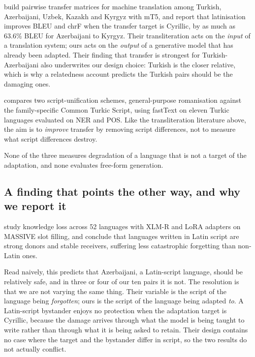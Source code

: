 \documentclass[final]{clv2025}
\begin{document}
 build pairwise transfer matrices for machine
translation among Turkish, Azerbaijani, Uzbek, Kazakh and Kyrgyz with mT5, and
report that latinisation improves BLEU and chrF when the transfer target is
Cyrillic, by as much as 63.6\% BLEU for Azerbaijani to Kyrgyz. Their
transliteration acts on the \emph{input} of a translation system; ours acts on
the \emph{output} of a generative model that has already been adapted. Their
finding that transfer is strongest for Turkish-Azerbaijani also underwrites our
design choice: Turkish is the closer relative, which is why a relatedness
account predicts the Turkish pairs should be the damaging ones.

 compares two script-unification schemes,
general-purpose romanisation against the family-specific Common Turkic Script,
using fastText on eleven Turkic languages evaluated on NER and POS. Like the
transliteration literature above, the aim is to \emph{improve} transfer by
removing script differences, not to measure what script differences destroy.

None of the three measures degradation of a language that is not a target of
the adaptation, and none evaluates free-form generation.

\subsection{A finding that points the other way, and why we report it}

 study knowledge loss across 52 languages with
XLM-R and LoRA adapters on MASSIVE slot filling, and conclude that languages
written in Latin script are strong donors and stable receivers, suffering less
catastrophic forgetting than non-Latin ones.

Read naively, this predicts that Azerbaijani, a Latin-script language, should
be relatively safe, and in three or four of our ten pairs it is not. The resolution is
that we are not varying the same thing. Their variable is the script of the
language being \emph{forgotten}; ours is the script of the language being
adapted \emph{to}. A Latin-script bystander enjoys no protection when the
adaptation target is Cyrillic, because the damage arrives through what the
model is being taught to write rather than through what it is being asked to
retain. Their design contains no case where the target and the bystander differ
in script, so the two results do not actually conflict.
\end{document}
